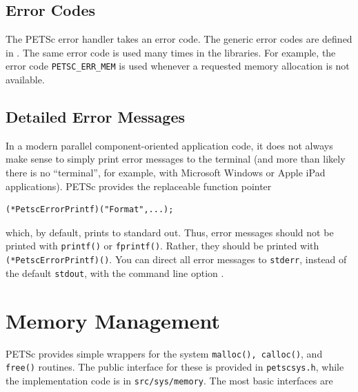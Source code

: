\subsection{Error Codes}

The PETSc error handler takes an error code.
The generic error codes are defined in
\href{http://www.mcs.anl.gov/petsc/petsc-master/include/petscerror.h.html}{}.
The same error code is used many times in the libraries.
For example, the error code \lstinline{PETSC_ERR_MEM} is used whenever a requested memory allocation is not available.

\subsection{Detailed Error Messages}
In a modern parallel component-oriented application code, it does not always make sense
to simply print error messages to the terminal (and more than likely there is no
``terminal'', for example, with Microsoft Windows or Apple iPad applications).
PETSc provides the replaceable function pointer
\begin{lstlisting}
(*PetscErrorPrintf)("Format",...);
\end{lstlisting}
which, by default, prints to standard out. Thus, error messages should not
be printed with \lstinline{printf()} or \lstinline{fprintf()}.
Rather, they should be printed with
\lstinline{(*PetscErrorPrintf)()}.
You can direct all error messages to \lstinline{stderr}, instead of the default \lstinline{stdout}, with the command line option .

\section{Memory Management}

PETSc provides simple wrappers for the system \lstinline{malloc(), calloc()}, and \lstinline{free()} routines. The public interface for these is provided in \lstinline{petscsys.h}, while the implementation code is in \lstinline{src/sys/memory}. The most basic interfaces are

